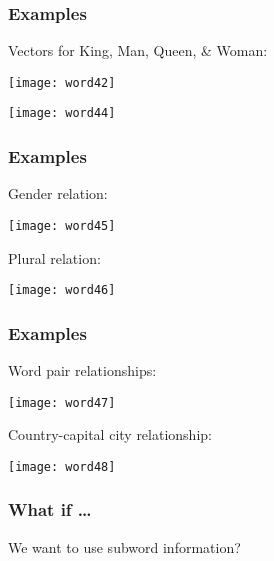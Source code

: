 \begin{frame}[fragile]\frametitle{Examples}
Vectors for King, Man, Queen, \& Woman:
\begin{center}
\texttt{[image: word42]}
\end{center}


\begin{center}
\texttt{[image: word44]}
\end{center}

\end{frame}

\begin{frame}[fragile]\frametitle{Examples}
Gender relation:
\begin{center}
\texttt{[image: word45]}
\end{center}
Plural relation:

\begin{center}
\texttt{[image: word46]}
\end{center}

\end{frame}


\begin{frame}[fragile]\frametitle{Examples}
Word pair relationships:
\begin{center}
\texttt{[image: word47]}
\end{center}
Country-capital city relationship:

\begin{center}
\texttt{[image: word48]}
\end{center}

\end{frame}

\begin{frame}[fragile]\frametitle{What if \ldots}
We want to use subword
information?
\end{frame}

